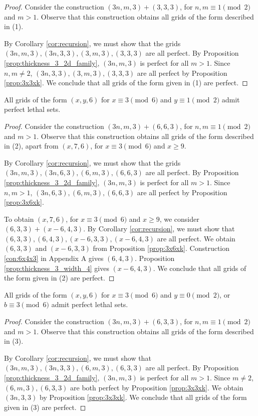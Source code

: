 \begin{proof}
Consider the construction $(3n,m,3) + (3,3,3)$, for $n,m \equiv 1 \pmod 2$ and $m > 1$. Observe that this construction obtains all grids of the form described in (1).

By Corollary \ref{cor:recursion}, we must show that the grids $(3n,m,3), (3n,3,3), (3,m,3),(3,3,3)$ are all perfect. By Proposition \ref{prop:thickness_3_2d_family}, $(3n,m,3)$ is perfect for all $m > 1$. Since $n,m \neq 2$, $(3n,3,3), (3,m,3),(3,3,3)$ are all perfect by Proposition \ref{prop:3x3xk}. We conclude that all grids of the form given in (1) are perfect.
\end{proof}

\begin{lem}
\label{lem:thickness_6_case_2}
All grids of the form $(x,y,6)$ for $x \equiv 3 \pmod 6$ and $y \equiv 1 \pmod 2$ admit perfect lethal sets.
\end{lem}

\begin{proof}
Consider the construction $(3n,m,3) + (6,6,3)$, for $n,m \equiv 1 \pmod 2$ and $m > 1$. Observe that this construction obtains all grids of the form described in (2), apart from $(x,7,6)$, for $x \equiv 3 \pmod 6$ and $x \geq 9$. 

By Corollary \ref{cor:recursion}, we must show that the grids $(3n,m,3), (3n,6,3), (6,m,3), (6,6,3)$ are all perfect. By Proposition \ref{prop:thickness_3_2d_family}, $(3n,m,3)$ is perfect for all $m > 1$. Since $n,m > 1$, $(3n,6,3), (6,m,3), (6,6,3)$ are all perfect by Proposition \ref{prop:3x6xk}.

To obtain $(x,7,6)$, for $x \equiv 3 \pmod 6$ and $x \geq 9$, we consider $(6,3,3) + (x-6, 4,3)$. By Corollary \ref{cor:recursion}, we must show that $(6,3,3), (6,4,3), (x-6,3,3), (x-6,4,3)$ are all perfect. We obtain $(6,3,3)$ and $(x-6,3,3)$ from Proposition \ref{prop:3x6xk}. Construction \ref{con:6x4x3} in Appendix A gives $(6,4,3)$. Proposition \ref{prop:thickness_3_width_4} gives $(x-6,4,3)$. We conclude that all grids of the form given in (2) are perfect. 
\end{proof}

\begin{lem}
\label{lem:thickness_6_case_3}
All grids of the form $(x,y,6)$ for $x \equiv 3 \pmod 6$ and $y \equiv 0 \pmod 2$, or $b \equiv 3 \pmod 6$ admit perfect lethal sets.
\end{lem}

\begin{proof}
Consider the construction $(3n,m,3) + (6,3,3)$, for $n,m \equiv 1 \pmod 2$ and $m > 1$. Observe that this construction obtains all grids of the form described in (3). 

By Corollary \ref{cor:recursion}, we must show that $(3n,m,3), (3n,3,3), (6,m,3), (6,3,3)$ are all perfect. By Proposition \ref{prop:thickness_3_2d_family}, $(3n,m,3)$ is perfect for all $m > 1$. Since $m \neq 2$, $(6,m,3),(6,3,3)$ are both perfect by Proposition \ref{prop:3x3xk}. We obtain $(3n,3,3)$ by Proposition \ref{prop:3x3xk}. We conclude that all grids of the form given in (3) are perfect.
\end{proof}

